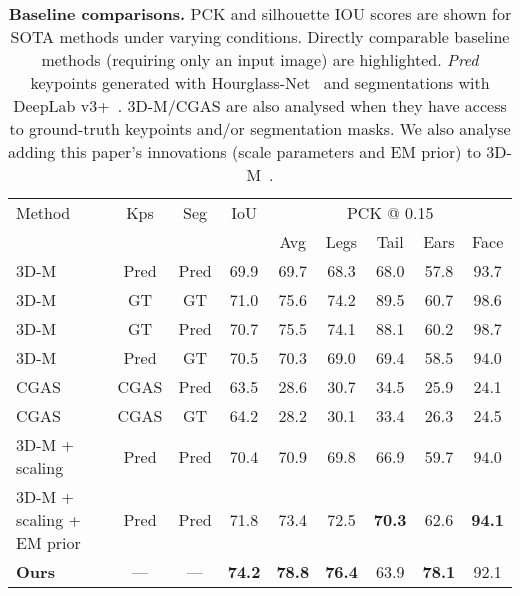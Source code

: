\begin{table}[]
{
    \small
    \centering
    \begin{tabular}{@{}lcccccccc@{}}
    \toprule
    \multicolumn{1}{l}{Method} & 
    \multicolumn{1}{c}{Kps} & 
    \multicolumn{1}{c}{Seg} & 
    \multicolumn{1}{c}{IoU} & 
    \multicolumn{5}{c}{PCK @ 0.15} \\
    \multicolumn{4}{c}{} &
    \multicolumn{1}{c}{Avg} &
    \multicolumn{1}{c}{Legs} &
    \multicolumn{1}{c}{Tail} &
    \multicolumn{1}{c}{Ears} &
    \multicolumn{1}{c}{Face} \\
    \midrule
    \rowcolor{comp} 3D-M~\cite{zuffi2017menagerie} & Pred & Pred & 69.9 & 69.7 & 68.3 & 68.0 & 57.8 & 93.7 \\
    \rowcolor{notcomp} 3D-M & GT & GT & 71.0 & 75.6 & 74.2 & 89.5 & 60.7 & 98.6 \\
    \rowcolor{notcomp} 3D-M & GT & Pred & 70.7 & 75.5 & 74.1 & 88.1 & 60.2 & 98.7 \\
    \rowcolor{notcomp} 3D-M & Pred & GT & 70.5 & 70.3 & 69.0 & 69.4 & 58.5 & 94.0 \\
    \hline
    \rowcolor{comp} CGAS~\cite{biggs2018creatures} & CGAS & Pred & 63.5 & 28.6 & 30.7 & 34.5 & 25.9 & 24.1 \\
    \rowcolor{notcomp} CGAS & CGAS & GT & 64.2 & 28.2 & 30.1 & 33.4 & 26.3 & 24.5 \\
    \hline
    \rowcolor{comp} 3D-M + scaling & Pred & Pred & 70.4 & 70.9 & 69.8 & 66.9 & 59.7 & 94.0 \\
    \rowcolor{comp} 3D-M + scaling + EM prior & Pred & Pred & 71.8 & 73.4 & 72.5 & \textbf{70.3} & 62.6 & \textbf{94.1} \\
    \hline
    \rowcolor{comp} \textbf{Ours} & --- & --- & \textbf{74.2} & \textbf{78.8} & \textbf{76.4} & 63.9 & \textbf{78.1} & 92.1 \\
    \bottomrule 
    \end{tabular}
    \vspace{1em}
    \caption[]{\label{tab:baselinesfix}\textbf{Baseline comparisons.} PCK and silhouette IOU scores are shown for SOTA methods under varying conditions. Directly comparable baseline methods (requiring only an input image) are highlighted. \emph{Pred} keypoints generated with Hourglass-Net~\cite{newell2016stacked} and segmentations with DeepLab v3+~\cite{journals/corr/ChenPK0Y16}. 3D-M/CGAS are also analysed when they have access to ground-truth keypoints and/or segmentation masks. We also analyse adding this paper's innovations (scale parameters and EM prior) to 3D-M~\cite{zuffi2017menagerie}.}
}
\end{table}